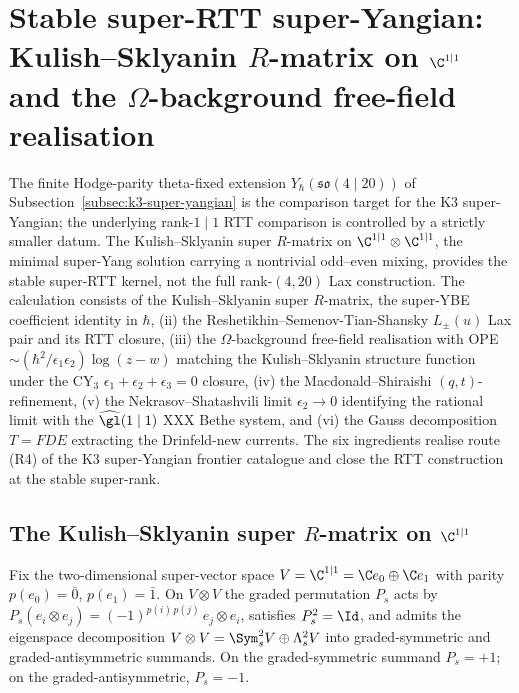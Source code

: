 \section{Stable super-RTT super-Yangian: Kulish--Sklyanin $R$-matrix on $\C^{1\mid 1}$ and the $\Omega$-background free-field realisation}
\label{sec:stable-super-rtt-omega}

The finite Hodge-parity theta-fixed extension
$Y_\hbar(\mathfrak{so}(4 \mid 20))$ of
Subsection~\ref{subsec:k3-super-yangian} is the comparison target for the
K3 super-Yangian; the underlying rank-$1\mid1$ RTT comparison is controlled
by a strictly smaller datum. The Kulish--Sklyanin super $R$-matrix on
$\C^{1 \mid 1} \otimes \C^{1 \mid 1}$, the minimal super-Yang solution
carrying a nontrivial odd--even mixing, provides the stable
super-RTT kernel, not the full rank-$(4,20)$ Lax construction. The
calculation consists of the Kulish--Sklyanin super $R$-matrix, the super-YBE coefficient
identity in $\hbar$, (ii) the Reshetikhin--Semenov-Tian-Shansky
$L_{\pm}(u)$ Lax pair and its RTT closure, (iii) the
$\Omega$-background free-field realisation with OPE
$\sim (\hbar^2/\epsilon_1 \epsilon_2) \log(z - w)$ matching the
Kulish--Sklyanin structure function under the CY$_3$
$\epsilon_1 + \epsilon_2 + \epsilon_3 = 0$ closure, (iv) the
Macdonald--Shiraishi $(q, t)$-refinement, (v) the
Nekrasov--Shatashvili limit $\epsilon_2 \to 0$ identifying the rational
limit with the $\widehat{\gl}(1 \mid 1)$ XXX Bethe system, and (vi) the
Gauss decomposition $T = F D E$ extracting the Drinfeld-new currents.
The six ingredients realise route (R4) of the K3 super-Yangian
frontier catalogue and close the RTT construction at the stable super-rank.

\subsection{The Kulish--Sklyanin super $R$-matrix on $\C^{1 \mid 1}$}
\label{subsec:kulish-sklyanin-R}

Fix the two-dimensional super-vector space
$V = \C^{1 \mid 1} = \C e_0 \oplus \C e_1$ with parity
$p(e_0) = \bar 0$, $p(e_1) = \bar 1$. On $V \otimes V$ the graded
permutation $P_s$ acts by
$P_s(e_i \otimes e_j) = (-1)^{p(i)\, p(j)}\, e_j \otimes e_i$, satisfies
$P_s^2 = \Id$, and admits the eigenspace decomposition
$V \otimes V = \Sym^2_s V \oplus \Lambda^2_s V$ into graded-symmetric
and graded-antisymmetric summands. On the graded-symmetric summand
$P_s = +1$; on the graded-antisymmetric, $P_s = -1$.

